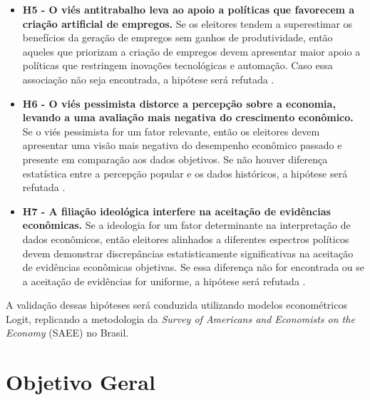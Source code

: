 \begin{itemize}
    \item \textbf{H5 - O viés antitrabalho leva ao apoio a políticas que favorecem a criação artificial de empregos.}  
    Se os eleitores tendem a superestimar os benefícios da geração de empregos sem ganhos de produtividade, então aqueles que priorizam a criação de empregos devem apresentar maior apoio a políticas que restringem inovações tecnológicas e automação. Caso essa associação não seja encontrada, a hipótese será refutada \cite{The_Myth_of_the_Rational_Voter}.  

    \item \textbf{H6 - O viés pessimista distorce a percepção sobre a economia, levando a uma avaliação mais negativa do crescimento econômico.}  
    Se o viés pessimista for um fator relevante, então os eleitores devem apresentar uma visão mais negativa do desempenho econômico passado e presente em comparação aos dados objetivos. Se não houver diferença estatística entre a percepção popular e os dados históricos, a hipótese será refutada \cite{The_Myth_of_the_Rational_Voter}.  

    \item \textbf{H7 - A filiação ideológica interfere na aceitação de evidências econômicas.}  
    Se a ideologia for um fator determinante na interpretação de dados econômicos, então eleitores alinhados a diferentes espectros políticos devem demonstrar discrepâncias estatisticamente significativas na aceitação de evidências econômicas objetivas. Se essa diferença não for encontrada ou se a aceitação de evidências for uniforme, a hipótese será refutada \cite{The_Myth_of_the_Rational_Voter}.  

\end{itemize}

A validação dessas hipóteses será conduzida utilizando modelos econométricos Logit, replicando a metodologia da \textit{Survey of Americans and Economists on the Economy} (SAEE) no Brasil.


\section{Objetivo Geral}

